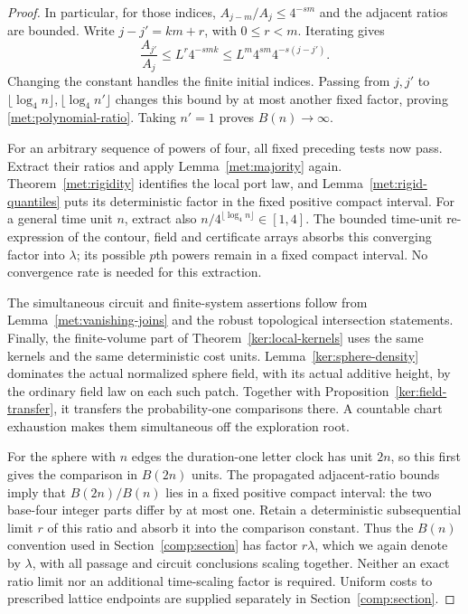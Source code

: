 \begin{proof}
In particular, for those indices,
$A_{j-m}/A_j\leq4^{-sm}$ and the adjacent ratios are bounded.
Write $j-j'=km+r$, with $0\leq r<m$.  Iterating gives
\[
 \frac{A_{j'}}{A_j}\leq L^r4^{-smk}
 \leq L^m4^{sm}4^{-s(j-j')}.
\]
Changing the constant handles the finite initial indices.  Passing
from $j,j'$ to $\lfloor\log_4n\rfloor,
\lfloor\log_4n'\rfloor$ changes this bound by at most another
fixed factor, proving \eqref{met:polynomial-ratio}.
Taking $n'=1$ proves $B(n)\to\infty$.

For an arbitrary sequence of powers of four, all fixed preceding
tests now pass.  Extract their ratios and apply
Lemma~\ref{met:majority} again.  Theorem~\ref{met:rigidity}
identifies the local port law, and
Lemma~\ref{met:rigid-quantiles} puts its deterministic factor in
the fixed positive compact interval.  For a general time unit
$n$, extract also $n/4^{\lfloor\log_4n\rfloor}\in[1,4]$.
The bounded time-unit re-expression of the contour, field and
certificate arrays absorbs this converging factor into $\lambda$;
its possible $p$th powers remain in a fixed compact interval.
No convergence rate is needed for this extraction.

The simultaneous circuit and finite-system assertions follow from
Lemma~\ref{met:vanishing-joins} and the robust topological
intersection statements.  Finally, the finite-volume part of
Theorem~\ref{ker:local-kernels} uses the same kernels and the same
deterministic cost units.  Lemma~\ref{ker:sphere-density}
dominates the actual normalized sphere field, with its actual
additive height, by the ordinary field law on each such patch.
Together with Proposition~\ref{ker:field-transfer}, it transfers
the probability-one comparisons there.  A countable chart exhaustion makes them
simultaneous off the exploration root.

For the sphere with $n$ edges the duration-one letter clock has unit
$2n$, so this first gives the comparison in $B(2n)$ units.
The propagated adjacent-ratio bounds imply that $B(2n)/B(n)$ lies
in a fixed positive compact interval: the two base-four integer
parts differ by at most one.  Retain a deterministic subsequential
limit $r$ of this ratio and absorb it into the comparison constant.
Thus the $B(n)$ convention used in Section~\ref{comp:section} has
factor $r\lambda$, which we again denote by $\lambda$, with all
passage and circuit conclusions scaling together.  Neither an exact
ratio limit nor an additional time-scaling factor is required.
Uniform costs to prescribed
lattice endpoints are supplied separately in
Section~\ref{comp:section}.
\end{proof}

